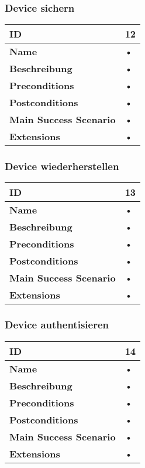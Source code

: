 \subsubsection{Device sichern}
\mbox{}
\begin{longtable}{| p{4cm} | p{11.7cm} |}
 \hline
 \textbf{ID} & 12\\ \hline 
 \textbf{Name} & • \\ \hline 
 \textbf{Beschreibung} & • \\ \hline 
 \textbf{Preconditions} & • \\ \hline 
 \textbf{Postconditions} & • \\ \hline 
 \textbf{Main Success Scenario} & • \\ \hline 
 \textbf{Extensions} & • \\ \hline 
 \end{longtable}
 
\subsubsection{Device wiederherstellen}
\mbox{}
\begin{longtable}{| p{4cm} | p{11.7cm} |}
 \hline
 \textbf{ID} & 13\\ \hline 
 \textbf{Name} & • \\ \hline 
 \textbf{Beschreibung} & • \\ \hline 
 \textbf{Preconditions} & • \\ \hline 
 \textbf{Postconditions} & • \\ \hline 
 \textbf{Main Success Scenario} & • \\ \hline 
 \textbf{Extensions} & • \\ \hline 
 \end{longtable}
 
\subsubsection{Device authentisieren}
\mbox{}
\begin{longtable}{| p{4cm} | p{11.7cm} |}
 \hline
 \textbf{ID} & 14\\ \hline 
 \textbf{Name} & • \\ \hline 
 \textbf{Beschreibung} & • \\ \hline 
 \textbf{Preconditions} & • \\ \hline 
 \textbf{Postconditions} & • \\ \hline 
 \textbf{Main Success Scenario} & • \\ \hline 
 \textbf{Extensions} & • \\ \hline 
 \end{longtable}
 
